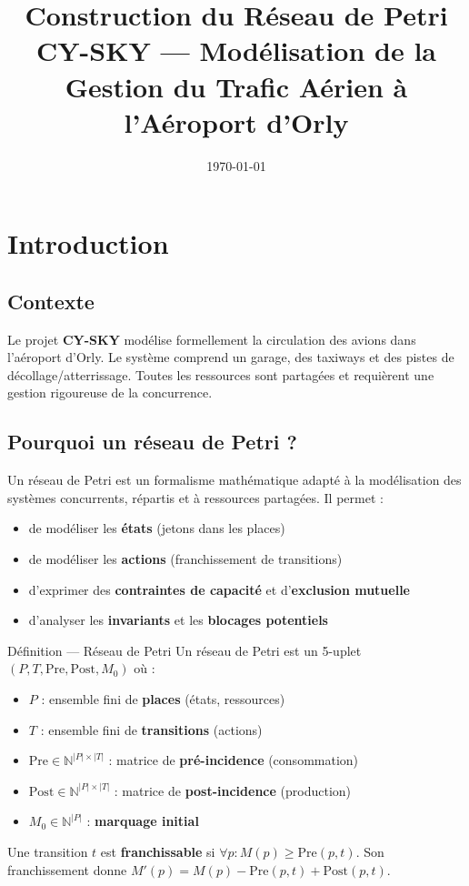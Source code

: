 \documentclass[a4paper,12pt]{article}
\title{%
  \textbf{Construction du Réseau de Petri}\\[0.6em]
  \large CY-SKY --- Modélisation de la Gestion du Trafic Aérien
  à l'Aéroport d'Orly}
\date{\today}
\begin{document}
\maketitle
\tableofcontents
\newpage

\section{Introduction}

\subsection{Contexte}

Le projet \textbf{CY-SKY} modélise formellement la circulation des avions
dans l'aéroport d'Orly. Le système comprend un garage, des taxiways et des
pistes de décollage/atterrissage. Toutes les ressources sont partagées et
requièrent une gestion rigoureuse de la concurrence.

\subsection{Pourquoi un réseau de Petri ?}

Un réseau de Petri est un formalisme mathématique adapté à la modélisation des
systèmes concurrents, répartis et à ressources partagées. Il permet :

\begin{itemize}
  \item de modéliser les \textbf{états} (jetons dans les places)
  \item de modéliser les \textbf{actions} (franchissement de transitions)
  \item d'exprimer des \textbf{contraintes de capacité} et d'\textbf{exclusion mutuelle}
  \item d'analyser les \textbf{invariants} et les \textbf{blocages potentiels}
\end{itemize}

\begin{defbox}{Définition --- Réseau de Petri}
Un réseau de Petri est un 5-uplet $(P, T, \mathrm{Pre}, \mathrm{Post}, M_0)$ où :
\begin{itemize}[nosep]
  \item $P$ : ensemble fini de \textbf{places} (états, ressources)
  \item $T$ : ensemble fini de \textbf{transitions} (actions)
  \item $\mathrm{Pre} \in \mathbb{N}^{|P| \times |T|}$ : matrice de \textbf{pré-incidence} (consommation)
  \item $\mathrm{Post} \in \mathbb{N}^{|P| \times |T|}$ : matrice de \textbf{post-incidence} (production)
  \item $M_0 \in \mathbb{N}^{|P|}$ : \textbf{marquage initial}
\end{itemize}
Une transition $t$ est \textbf{franchissable} si $\forall p : M(p) \geq \mathrm{Pre}(p,t)$.
Son franchissement donne $M'(p) = M(p) - \mathrm{Pre}(p,t) + \mathrm{Post}(p,t)$.
\end{defbox}
\end{document}
